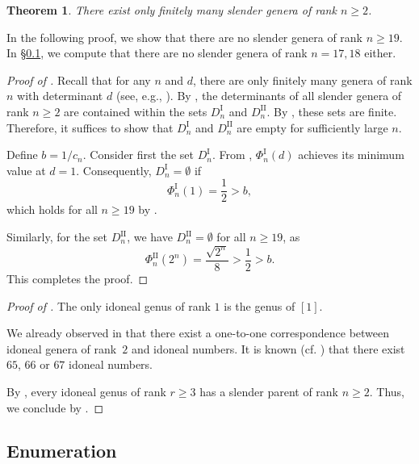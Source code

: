 \documentclass[a4paper]{amsart}
\theoremstyle{definition}
\theoremstyle{plain}
\newtheorem{theorem}[definition]{Theorem}
\newcommand{\I}{\mathrm{I}}
\newcommand{\II}{\mathrm{II}}
\begin{document}
\begin{theorem} \label{thm:slender}
There exist only finitely many slender genera of rank \(n \geq 2\). 
\end{theorem}

In the following proof, we show that there are no slender genera of rank \(n \geq 19\).
In §\ref{subsec:enumeration}, we compute that there are no slender genera of rank \(n = 17,18\) either. 

\begin{proof}[Proof of ]
Recall that for any \(n\) and \(d\), there are only finitely many genera of rank \(n\) with determinant \(d\) (see, e.g., \cite[(20.2)]{kneser}). By , the determinants of all slender genera of rank \(n \geq 2\) are contained within the sets \(D_n^\I\) and \(D_n^\II\). By , these sets are finite. Therefore, it suffices to show that \(D_n^\I\) and \(D_n^\II\) are empty for sufficiently large \(n\).

Define \(b = 1/c_n\). Consider first the set \(D_n^\I\). From , \(\Phi_n^\I(d)\) achieves its minimum value at \(d = 1\). Consequently, \(D_n^\I = \emptyset\) if 
\[
     \Phi_n^\I(1) = \frac{1}{2} > b,
\]
which holds for all \(n \geq 19\) by .

Similarly, for the set \(D_n^\II\), we have \(D_n^\II = \emptyset\) for all \(n \geq 19\), as
\[
     \Phi_n^\II(2^n) = \frac{\sqrt{2^n}}{8} > \frac{1}{2} > b.
\]
This completes the proof.
\end{proof}

\begin{proof}[Proof of ]
    The only idoneal genus of rank \(1\) is the genus of \([1]\). 
    
    We already observed in  that there exist a one-to-one correspondence between idoneal genera of rank~\(2\) and idoneal numbers. It is known (cf. ) that there exist \(65\), \(66\) or \(67\) idoneal numbers.

    By , every idoneal genus of rank \(r \geq 3\) has a slender parent of rank \(n \geq 2\). Thus, we conclude by .
\end{proof}

\subsection{Enumeration} \label{subsec:enumeration}
\end{document}
